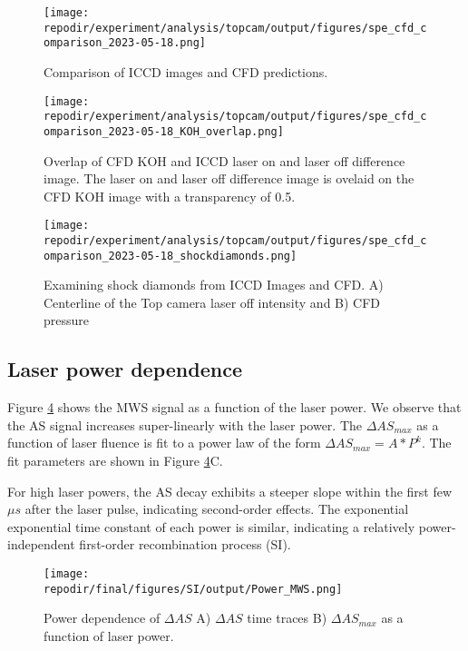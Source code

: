\begin{figure}[]
\centering
\texttt{[image: \\repodir/experiment/analysis/topcam/output/figures/spe\_cfd\_comparison\_2023-05-18.png]}
\caption{Comparison of ICCD images and CFD predictions. }
\label{fig:SI_iccd_cfd_comparison}
\end{figure}


\begin{figure}[]
\centering
\texttt{[image: \\repodir/experiment/analysis/topcam/output/figures/spe\_cfd\_comparison\_2023-05-18\_KOH\_overlap.png]}
\caption{Overlap of CFD KOH and ICCD laser on and laser off difference image. The laser on and laser off difference image is ovelaid on the CFD KOH image with a transparency of 0.5. }
\label{fig:SI_iccd_cfd_comparison_KOH_overlap}
\end{figure}

\begin{figure}
    \centering
    \texttt{[image: \\repodir/experiment/analysis/topcam/output/figures/spe\_cfd\_comparison\_2023-05-18\_shockdiamonds.png]} 
    \caption{Examining shock diamonds from ICCD Images and CFD. A) Centerline of the Top camera laser off intensity and B) CFD pressure}
    \label{fig:SI_iccd_cfd_comparison_KOH}
\end{figure}

\subsection{Laser power dependence}

Figure \ref{fig:SI_power_dependence_AS} shows the MWS signal as a function of the laser power. We observe that the AS signal increases super-linearly with the laser power. The $\Delta AS_{max}$ as a function of laser fluence is fit to a power law of the form $\Delta AS_{max} = A * P^k$. The fit parameters are shown in Figure \ref{fig:SI_power_dependence_AS}C.

For high laser powers, the AS decay exhibits a steeper slope within the first few $\mu s$ after the laser pulse, indicating second-order effects. The exponential exponential time constant of each power is similar, indicating a relatively power-independent first-order recombination process (SI).

\begin{figure}[h]
    \texttt{[image: \\repodir/final/figures/SI/output/Power\_MWS.png]} 
    \caption{Power dependence of $\Delta AS$ A) $\Delta AS$ time traces B) $\Delta AS_{max}$ as a function of laser power. }
    \label{fig:SI_power_dependence_AS}
\end{figure}



